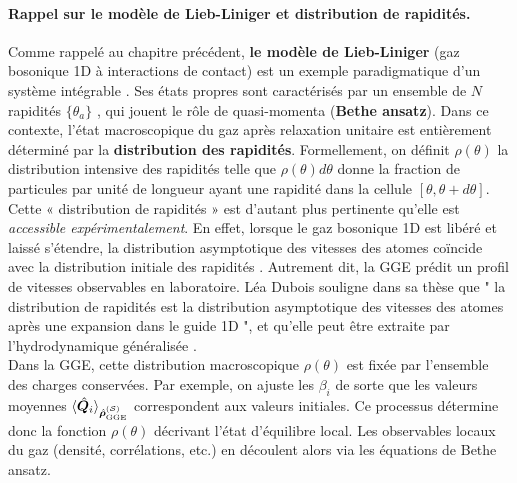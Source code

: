 \paragraph{Rappel sur le modèle de Lieb-Liniger et distribution de rapidités.}
Comme rappelé au chapitre précédent, {\bf le modèle de  Lieb-Liniger} (gaz bosonique 1D à interactions de contact) est un exemple paradigmatique d’un système intégrable \cite{??}. Ses états propres sont caractérisés par un ensemble de $N$  rapidités $\{ \theta_a \}$ , qui jouent le rôle de quasi-momenta ({\bf Bethe ansatz}). Dans ce contexte, l’état macroscopique du gaz après relaxation unitaire est entièrement déterminé par la {\bf distribution des rapidités}. Formellement, on définit $\rho(\theta)$ la distribution intensive des rapidités telle que $\rho(\theta) d \theta$ donne la fraction de particules par unité de longueur ayant une rapidité dans la cellule $[\theta , \theta + d \theta ] $.\\

Cette « distribution de rapidités » est d’autant plus pertinente qu’elle est {\em accessible expérimentalement}. En effet, lorsque le gaz bosonique 1D est libéré et laissé s’étendre, la distribution asymptotique des vitesses des atomes coïncide avec la distribution initiale des rapidités \cite{??} . Autrement dit, la GGE prédit un profil de vitesses observables en laboratoire. Léa Dubois souligne dans sa thèse que " la distribution de rapidités est la distribution asymptotique des vitesses des atomes après une expansion dans le guide 1D ", et qu’elle peut être extraite par l’hydrodynamique généralisée \cite{??}. \\

Dans la GGE, cette distribution macroscopique $\rho(\theta)$ est fixée par l’ensemble des charges conservées. Par exemple, on ajuste les $\beta_i$ de sorte que les valeurs moyennes $\langle \hat{\bm{Q}}_i \rangle_{\hat{\bm{\rho}}^{(\mathcal{S})}_{\mathrm{GGE}}}$ correspondent aux valeurs initiales. Ce processus détermine donc la fonction $\rho(\theta)$ décrivant l’état d’équilibre local. Les observables locaux du gaz (densité, corrélations, etc.) en découlent alors via les équations de Bethe ansatz. 


